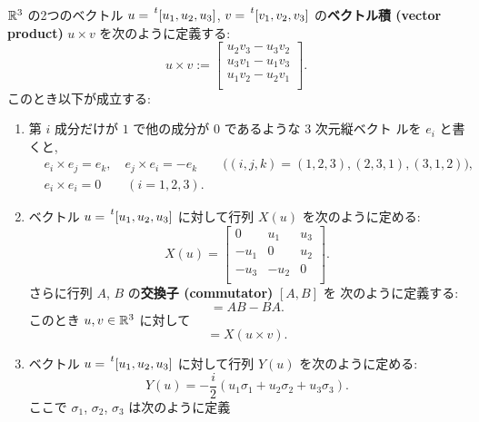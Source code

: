 \documentclass[12pt,twoside]{jarticle}
\begin{document}
\begin{question}[ベクトル積の定義, 15点]
  \label{q:def-vp}
  ${\mathbb R}^3$ の2つのベクトル $u=\tp{[u_1,u_2,u_3]}$, $v=\tp{[v_1,v_2,v_3]}$ 
  の{\bf ベクトル積 (vector product)} $u\times v$ を次のように定義する:
  \begin{equation*}
    u\times v :=
    \begin{bmatrix}
      u_2 v_3 - u_3 v_2 \\
      u_3 v_1 - u_1 v_3 \\
      u_1 v_2 - u_2 v_1 \\
    \end{bmatrix}.
  \end{equation*}
  このとき以下が成立する:
  \begin{enumerate}
  \item 第 $i$ 成分だけが $1$ で他の成分が $0$ であるような $3$ 次元縦ベクト
  ルを $e_i$ と書くと,
  \begin{align*}
    &
    e_i \times e_j = e_k, \quad  e_j \times e_i = -e_k
    \qquad \bigl((i,j,k)=(1,2,3),(2,3,1),(3,1,2)\bigr),
    \\ &
    e_i\times e_i = 0 \qquad (i=1,2,3).
  \end{align*}
  \item ベクトル $u=\tp{[u_1,u_2,u_3]}$ に対して行列 $X(u)$ を次のように定める:
    \begin{equation*}
      X(u) =
      \begin{bmatrix}
         0   &  u_1 & u_3 \\
        -u_1 &  0   & u_2 \\
        -u_3 & -u_2 & 0   \\
      \end{bmatrix}.
    \end{equation*}
    さらに行列 $A$, $B$ の{\bf 交換子 (commutator)} $[A,B]$ を
    次のように定義する:
    \begin{equation*}
      [A,B] = AB - BA.
    \end{equation*}
    このとき $u,v\in{\mathbb R}^3$ に対して
    \begin{equation*}
      [X(u), X(v)] = X(u\times v).
    \end{equation*}
  \item ベクトル $u=\tp{[u_1,u_2,u_3]}$ に対して行列 $Y(u)$ を次のように定める:
    \begin{equation*}
      Y(u) = -\frac{i}{2}(u_1\sigma_1 + u_2\sigma_2 + u_3\sigma_3).
    \end{equation*}
    ここで $\sigma_1$, $\sigma_2$, $\sigma_3$ は次のように定義

\end{enumerate}
\end{question}
\end{document}
